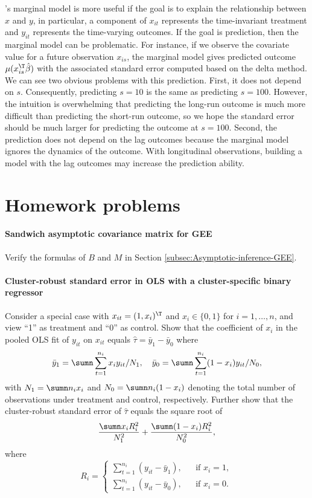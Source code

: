 \citet{liang1986longitudinal}'s marginal model is more useful if the goal is to explain the relationship between $x$ and $y$, in particular, a component of $x_{it}$ represents the time-invariant treatment and $y_{it}$ represents the time-varying outcomes. If the goal is prediction, then the marginal model can be problematic. For instance, if we observe the covariate value for a future observation $x_{is}$, the marginal model gives predicted outcome $\mu(x_{is}^{\T} \hat\beta)$ with the associated standard error computed based on the delta method. We can see two obvious problems with this prediction. First, it does not depend on $s$. Consequently, predicting $s=10$ is the same as predicting $s=100$. However, the intuition is overwhelming that predicting the long-run outcome is much more difficult than predicting the short-run outcome, so we hope the standard error should be much larger for predicting the outcome at $s=100$. Second, the prediction does not depend on the lag outcomes because the marginal model ignores the dynamics of the outcome. With longitudinal observations, building a model with the lag outcomes may increase the prediction ability. 





\section{Homework problems}

 

\paragraph{Sandwich asymptotic covariance matrix for GEE}\label{hw21::gee-sandwichvariance}

Verify the formulas of $B$ and $M$ in Section \ref{subsec:Asymptotic-inference-GEE}. 


\paragraph{Cluster-robust standard error in OLS with a cluster-specific binary regressor}\label{hw21::crse-binary-x}

Consider a special case with $x_{it} = (1,x_i)^{\T}$ and $x_i \in \{0,1\}$ for $i=1,\ldots, n$, and view ``1'' as treatment and ``0'' as control. Show that the coefficient of $x_i$ in the pooled OLS fit of $y_{it}$ on $x_{it} $ equals $ \hat{\tau} =  \bar{y}_1 - \bar{y}_0$ where
$$
\bar{y}_1 = \sumn \sum_{t=1}^{n_i} x_{i} y_{it} / N_1,\quad 
\bar{y}_0 = \sumn \sum_{t=1}^{n_i} (1-x_{i}) y_{it}/N_0,
$$
with $N_1 = \sumn  n_i x_{i}$ and $N_0 = \sumn  n_i (1-x_{i})$ denoting the total number of observations under treatment and control, respectively. Further show that the cluster-robust standard error of $ \hat{\tau}$ equals the square root of
$$
\frac{  \sumn x_i R_i^2 }{  N_1^2 }  
+  \frac{  \sumn (1-x_i) R_i^2 }{  N_0^2 } ,
$$
where 
$$
R_i = \left\{
\begin{array}{ccc}
 \sum_{t=1}^{n_i} (y_{it} - \bar{y}_1) , &&\text{if } x_i=1,\\
  \sum_{t=1}^{n_i} (y_{it} - \bar{y}_0) , &&\text{if } x_i=0. 
\end{array}
\right. 
$$


